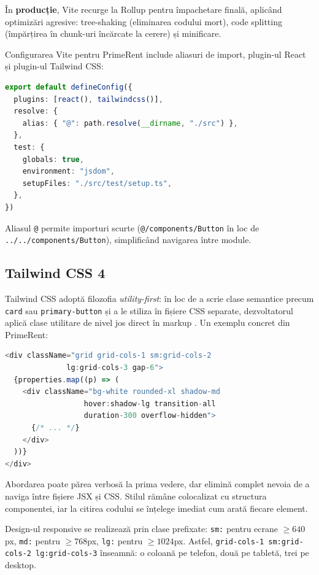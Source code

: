 \documentclass[12pt,a4paper,oneside]{report}
\begin{document}
În \textbf{producție}, Vite recurge la Rollup pentru împachetare finală, aplicând optimizări agresive: tree-shaking (eliminarea codului mort), code splitting (împărțirea în chunk-uri încărcate la cerere) și minificare.

Configurarea Vite pentru PrimeRent include aliasuri de import, plugin-ul React și plugin-ul Tailwind CSS:

\begin{lstlisting}[language=TypeScript, caption={Configurarea Vite (vite.config.ts)}]
export default defineConfig({
  plugins: [react(), tailwindcss()],
  resolve: {
    alias: { "@": path.resolve(__dirname, "./src") },
  },
  test: {
    globals: true,
    environment: "jsdom",
    setupFiles: "./src/test/setup.ts",
  },
})
\end{lstlisting}

Aliasul \texttt{@} permite importuri scurte (\texttt{@/components/Button} în loc de \texttt{../../components/Button}), simplificând navigarea între module.

\subsection{Tailwind CSS 4}

Tailwind CSS adoptă filozofia \textit{utility-first}: în loc de a scrie clase semantice precum \texttt{card} sau \texttt{primary-button} și a le stiliza în fișiere CSS separate, dezvoltatorul aplică clase utilitare de nivel jos direct în markup \cite{tailwind}. Un exemplu concret din PrimeRent:

\begin{lstlisting}[language=TypeScript, caption={Exemplu de stilizare Tailwind CSS în JSX}]
<div className="grid grid-cols-1 sm:grid-cols-2
              lg:grid-cols-3 gap-6">
  {properties.map((p) => (
    <div className="bg-white rounded-xl shadow-md
                  hover:shadow-lg transition-all
                  duration-300 overflow-hidden">
      {/* ... */}
    </div>
  ))}
</div>
\end{lstlisting}

Abordarea poate părea verbosă la prima vedere, dar elimină complet nevoia de a naviga între fișiere JSX și CSS. Stilul rămâne colocalizat cu structura componentei, iar la citirea codului se înțelege imediat cum arată fiecare element.

Design-ul responsive se realizează prin clase prefixate: \texttt{sm:} pentru ecrane $\geq 640$px, \texttt{md:} pentru $\geq 768$px, \texttt{lg:} pentru $\geq 1024$px. Astfel, \texttt{grid-cols-1 sm:grid-cols-2 lg:grid-cols-3} înseamnă: o coloană pe telefon, două pe tabletă, trei pe desktop.
\end{document}
